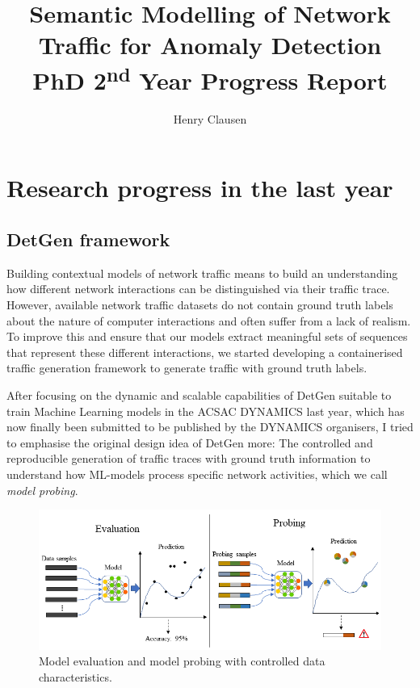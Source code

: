 \documentclass[a4paper,12pt,twoside]{article}
\makeatletter
\newcommand*{\toccontents}{\@starttoc{toc}}
\makeatother
\begin{document}
\title{\LARGE {\bf Semantic Modelling of Network Traffic for Anomaly Detection}\\
PhD 2\textsuperscript{nd} Year Progress Report
 \vspace*{-5mm}
}
\author{Henry Clausen}

\maketitle



\toccontents


\section{Research progress in the last year}
  
\subsection{DetGen framework}
Building contextual models of network traffic means to build an understanding how different network interactions can be distinguished via their traffic trace. However, available network traffic datasets do not contain ground truth labels about the nature of computer interactions and often suffer from a lack of realism. To improve this and ensure that our models extract meaningful sets of sequences that represent these different interactions, we started developing a containerised traffic generation framework to generate traffic with ground truth labels. 



After focusing on the dynamic and scalable capabilities of DetGen suitable to train Machine Learning models in the ACSAC DYNAMICS last year, which has now finally been submitted to be published by the DYNAMICS organisers, I tried to emphasise the original design idea of DetGen more: The controlled and reproducible generation of traffic traces with ground truth information to understand how ML-models process specific network activities, which we call \textit{model probing}.

 
\begin{figure}
\centering
\includegraphics[width=\textwidth]{images/Eva_Prob.png}
\caption{Model evaluation and model probing with controlled data characteristics.}\label{Fig:Prob}
\end{figure}
\end{document}
